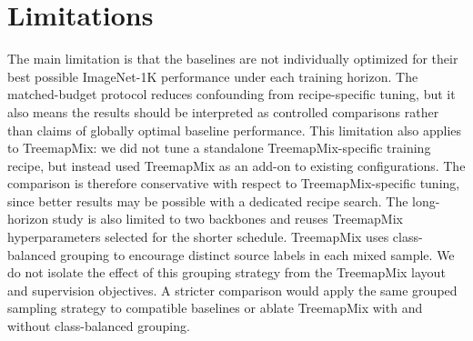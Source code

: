 \section{Limitations}
The main limitation is that the baselines are not individually optimized for their best possible ImageNet-1K performance under each training horizon. The matched-budget protocol reduces confounding from recipe-specific tuning, but it also means the results should be interpreted as controlled comparisons rather than claims of globally optimal baseline performance. This limitation also applies to TreemapMix: we did not tune a standalone TreemapMix-specific training recipe, but instead used TreemapMix as an add-on to existing configurations. The comparison is therefore conservative with respect to TreemapMix-specific tuning, since better results may be possible with a dedicated recipe search. The long-horizon study is also limited to two backbones and reuses TreemapMix hyperparameters selected for the shorter schedule.
TreemapMix uses class-balanced grouping to encourage distinct source labels in
each mixed sample. We do not isolate the effect of this grouping strategy from
the TreemapMix layout and supervision objectives. A stricter comparison would
apply the same grouped sampling strategy to compatible baselines or ablate
TreemapMix with and without class-balanced grouping.